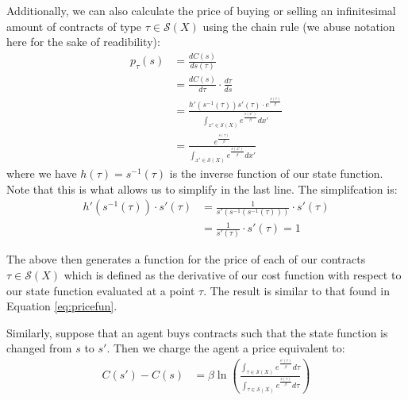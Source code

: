 Additionally, we can also calculate the price of buying or selling an infinitesimal amount of contracts of type $\tau \in \mathcal{S}(X)$ using the chain rule (we abuse notation here for the sake of readibility):
\begin{align}
p_{\tau}(s) &= \frac{dC(s)}{ds(\tau)} \\
&= \frac{dC(s)}{d\tau}\cdot\frac{d\tau}{ds} \\
&=\frac{h'(s^{-1}(\tau))s'(\tau) \cdot e^{\frac{s(\tau)}{\beta}}}{\int_{x'\in\mathcal{S}(X)} e^{\frac{s(x')}{\beta}} dx'}\\
&=\frac{e^{\frac{s(\tau)}{\beta}}}{\int_{x'\in\mathcal{S}(X)} e^{\frac{s(x')}{\beta}} dx'}
\end{align}
where we have $h(\tau) = s^{-1}(\tau)$ is the inverse function of our state function. Note that this is what allows us to simplify in the last line. The simplifcation is:
\begin{align}
h'(s^{-1}(\tau))\cdot s'(\tau) &= \frac{1}{s'(s^{-1}(s^{-1}(\tau)))}\cdot s'(\tau) \\
&= \frac{1}{s'(\tau)}\cdot s'(\tau) = 1
\end{align}

The above then generates a function for the price of each of our contracts $\tau \in \mathcal{S}(X)$ which is defined as the derivative of our cost function with respect to our state function evaluated at a point $\tau$. The result is similar to that found in Equation \ref{eq:pricefun}. 

Similarly, suppose that an agent buys contracts such that the state function is changed from $s$ to $s'$. Then we charge the agent a price equivalent to:
\begin{align}
C(s') - C(s) &= \beta \ln \left(\frac{\int_{\tau \in \mathcal{S}(X)} e^{\frac{s'(\tau)}{\beta}} d\tau}{\int_{\tau \in \mathcal{S}(X)} e^{\frac{s(\tau)}{\beta}} d\tau} \right)
\end{align}

